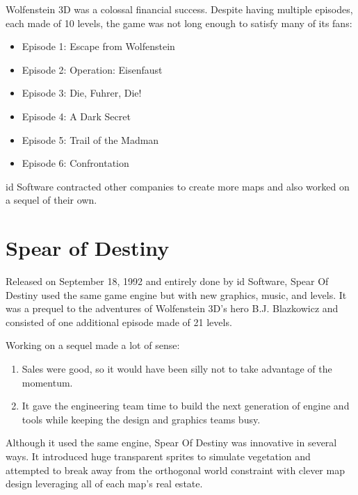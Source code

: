\documentclass[book.tex]{subfiles}
\begin{document}
Wolfenstein 3D was a colossal financial success. Despite having multiple episodes, each made of 10 levels, the game was not long enough to satisfy many of its fans:\\
\par
\begin{itemize}
\item Episode 1: Escape from Wolfenstein
\item Episode 2: Operation: Eisenfaust
\item Episode 3: Die, Fuhrer, Die!
\item Episode 4: A Dark Secret
\item Episode 5: Trail of the Madman
\item Episode 6: Confrontation
\end{itemize}
id Software contracted other companies to create more maps and also worked on a sequel of their own.

\section{Spear of Destiny}
Released on September 18, 1992 and entirely done by id Software, Spear Of Destiny used the same game engine but with new graphics, music, and levels. It was a prequel to the adventures of Wolfenstein 3D's hero B.J. Blazkowicz and consisted of one additional episode made of 21 levels.\\
   \par
\begin{figure}[H]
\centering
 \end{figure}
 \par
 Working on a sequel made a lot of sense:
 \begin{enumerate}
 \item Sales were good, so it would have been silly not to take advantage of the momentum.
 \item It gave the engineering team time to build the next generation of engine and tools while keeping the design and graphics teams busy.
 \end{enumerate}
Although it used the same engine, Spear Of Destiny was innovative in several ways. It introduced huge transparent sprites to simulate vegetation and attempted to break away from the orthogonal world constraint with clever map design leveraging all of each map's real estate.
    \par
\begin{figure}[H]
\centering
 \end{figure}
 \par
\end{document}
